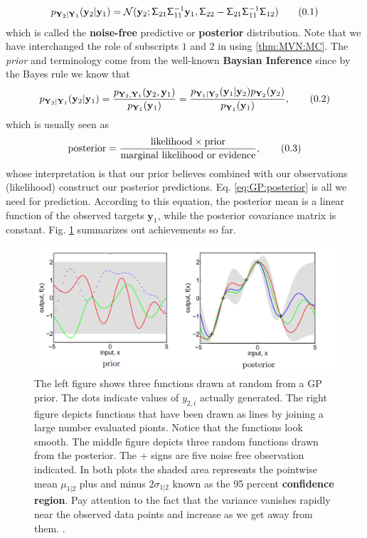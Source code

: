 \documentclass[10pt]{article}
\theoremstyle{definition}
\newcommand\eqnum{\addtocounter{equation}{1}\tag{\arabic{section}.\arabic{equation}}}
\begin{document}
\begin{equation*}
p_{\mathbf{Y}_2|\mathbf{Y}_1}(\mathbf{y}_2|\mathbf{y}_1) = 
\mathcal{N}(\mathbf{y}_2;\mathsf{\Sigma}_{21}\mathsf{\Sigma}_{11}^{-1}\mathbf{y}_1, \mathsf{\Sigma}_{22} - 
\mathsf{\Sigma}_{21} \mathsf{\Sigma}_{11}^{-1} \mathsf{\Sigma}_{12})
\eqnum
\label{eq:GP:posterior}
\end{equation*}
which is called the \textbf{noise-free} predictive or \textbf{posterior} distribution. Note that we have interchanged the role of subscripts $1$ and $2$ in using \cref{thm:MVN:MC}. The \textit{prior} and  terminology come from the well-known \textbf{Baysian Inference} since by the Bayes rule we know that
\begin{equation*}
p_{\mathbf{Y}_2|\mathbf{Y}_1}(\mathbf{y}_2|\mathbf{y}_1) =
\frac{p_{\mathbf{Y}_2,\mathbf{Y}_1}(\mathbf{y}_2,\mathbf{y}_1)}{p_{\mathbf{Y}_1}(\mathbf{y}_1)} = 
\frac{p_{\mathbf{Y}_1|\mathbf{Y}_2}(\mathbf{y}_1|\mathbf{y}_2)p_{\mathbf{Y}_2}(\mathbf{y}_2)}{p_{\mathbf{Y}_1}(\mathbf{y}_1)},
\eqnum
\end{equation*}
which is usually seen as
\begin{equation*}
\text{posterior} = \frac{\text{likelihood} \times \text{prior}}{\text{marginal likelihood or evidence}},
\eqnum
\end{equation*}
whose interpretation is that our prior believes combined with our observations (likelihood) construct our posterior predictions. Eq. \eqref{eq:GP:posterior} is all we need for prediction. According to this equation, the posterior mean is a linear function of the observed targets $\mathbf{y}_1$, while the posterior covariance matrix is constant. Fig. \ref{fig:prior:posterior} summarizes out achievements so far.
\begin{figure}[t!]
\centering
\includegraphics[width=12cm]{figs/prior-posterior.png}
\caption{The left figure shows three functions drawn at random from a GP prior. The dots indicate values of $y_{2,i}$ actually generated. The right figure depicts functions that have been drawn as lines by joining a large number evaluated pionts. Notice that the functions look smooth. The middle figure depicts three random functions drawn from the posterior. The + signs are five noise free observation indicated. In both plots the shaded area represents the pointwise mean $\mu_{1|2}$ plus and minus $2\sigma_{1|2}$ known as the 95 percent \textbf{confidence region}. Pay attention to the fact that the variance vanishes rapidly near the observed data points and increase as we get away from them. \cite{Rasmussen2006}.}
\label{fig:prior:posterior}
\end{figure}
\end{document}
